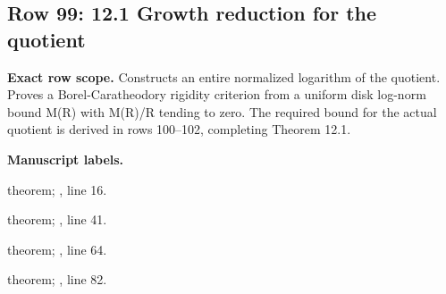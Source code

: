\subsection{Row 99: 12.1 Growth reduction for the quotient}
\label{row:99}
\textbf{Exact row scope.} Constructs an entire normalized logarithm of the quotient. Proves a Borel-Caratheodory rigidity criterion from a uniform disk log-norm bound M(R) with M(R)/R tending to zero. The required bound for the actual quotient is derived in rows 100--102, completing Theorem 12.1.\par\smallskip
\textbf{Manuscript labels.} \par\smallskip
{\small{}\par}
{\footnotesize\color{muted}theorem; , line 16.\par}\smallskip
{\small{}\par}
{\footnotesize\color{muted}theorem; , line 41.\par}\smallskip
{\small{}\par}
{\footnotesize\color{muted}theorem; , line 64.\par}\smallskip
{\small{}\par}
{\footnotesize\color{muted}theorem; , line 82.\par}\smallskip
{}
